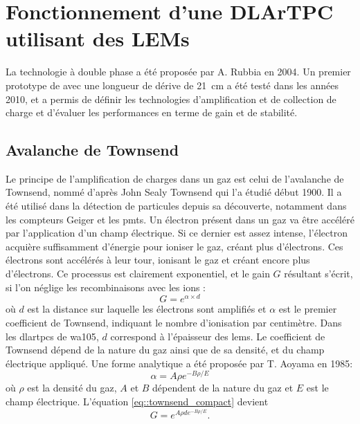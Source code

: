   \section{Fonctionnement d'une DLArTPC utilisant des LEMs}\label{sec::dlartpc}
 
      La technologie à double phase a été proposée par A. Rubbia\cite{Rubbia2004} en 2004. Un premier prototype de \threeL{} avec une longueur de dérive de \SI{21}{\centi\meter} a été testé dans les années 2010, et a permis de définir les technologies d'amplification et de collection de charge\cite{Cantini2013} et d'évaluer les performances en terme de gain et de stabilité\cite{Cantini2014}.

    \subsection{Avalanche de Townsend}\label{sec::townsend}
      
      Le principe de l'amplification de charges dans un gaz est celui de l'avalanche de Townsend, nommé d'après John Sealy Townsend qui l'a étudié début 1900\cite{Townsend1910}. Il a été utilisé dans la détection de particules depuis sa découverte, notamment dans les compteurs Geiger et les \glspl{pmt}. Un électron présent dans un gaz va être accéléré par l'application d'un champ électrique. Si ce dernier est assez intense, l'électron acquière suffisamment d'énergie pour ioniser le gaz, créant plus d'électrons. Ces électrons sont accélérés à leur tour, ionisant le gaz et créant encore plus d'électrons. Ce processus est clairement exponentiel, et le gain $G$ résultant s'écrit, si l'on néglige les recombinaisons avec les ions :
      \begin{equation}\label{eq::townsend_compact}
        G = e^{\alpha\times d}
      \end{equation}
      où $d$ est la distance sur laquelle les électrons sont amplifiés et $\alpha$ est le premier coefficient de Townsend, indiquant le nombre d'ionisation par centimètre. Dans les \glspl{dlartpc} de \gls{wa105}, $d$ correspond à l'épaisseur des \glspl{lem}. Le coefficient de Townsend dépend de la nature du gaz ainsi que de sa densité, et du champ électrique appliqué. Une forme analytique a été proposée par T. Aoyama en 1985\cite{Aoyama1985}:
      \begin{equation}\label{eq::townsend_coef}
        \alpha = A\rho e^{-B\rho/E}
      \end{equation}
      où $\rho$ est la densité du gaz, $A$ et $B$ dépendent de la nature du gaz et $E$ est le champ électrique. L'équation \eqref{eq::townsend_compact} devient
      \begin{equation}\label{eq::townsend}
        G = e^{A\rho  de^{-B\rho /E}}.
      \end{equation}

